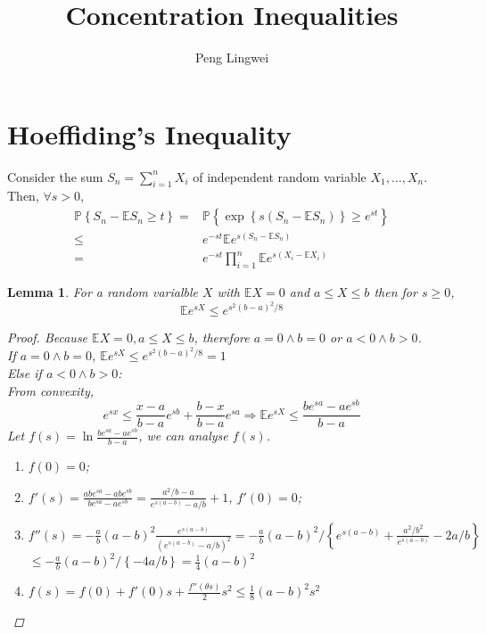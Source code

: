 \documentclass[a4paper]{article}
\title{Concentration Inequalities}
\author{Peng Lingwei}
\newtheorem{lemma}{Lemma}
\begin{document}
\maketitle
\tableofcontents
\newpage

\section{Hoeffiding's Inequality}%
\label{sec:hoeffiding_s_inequality}

Consider the sum $ S_n = \sum^{n}_{i=1} X_i $ of independent random variable $ X_1, \ldots, X_n $.
Then, $ \forall s > 0 $,
\begin{align*}
    \mathbb{P}\left\{ S_n - \mathbb{E}S_n \ge t \right\}
    =& \mathbb{P} \left\{ \exp\left\{ s(S_n - \mathbb{E}S_n) \right\} \ge e^{st} \right\}\\
    \le& e^{-st}\mathbb{E}e^{s(S_n - \mathbb{E}S_n)}\\
    =& e^{-st} \prod^{n}_{i=1} \mathbb{E} e^{s(X_i - \mathbb{E}X_i)}
\end{align*}
\begin{lemma}
    For a random varialble $ X $ with $ \mathbb{E}X = 0 $ and $ a \le X \le b $ then for $ s \ge 0 $,
    \[
        \mathbb{E} e^{sX} \le e^{s^2{(b-a)}^2 / 8}
    \]
    
    \begin{proof}
        Because $ \mathbb{E}X = 0, a \le X \le b $, therefore $ a = 0 \wedge b = 0 $ or $ a < 0 \wedge b > 0 $.\\
        If $ a = 0 \wedge b = 0 $, $ \mathbb{E} e^{sX} \le e^{s^2{(b-a)}^2 / 8} = 1 $\\
        Else if $ a < 0 \wedge b > 0 $:\\
        From convexity,
        \[
            e^{sx} \le \frac{x - a}{b - a} e^{sb} + \frac{b - x}{b-a} e^{sa}
            \Rightarrow
            \mathbb{E}e^{sX} \le \frac{be^{sa} - ae^{sb}}{b-a} 
        \]
        Let $ f(s) = \ln\frac{be^{sa} - ae^{sb}}{b-a} $, we can analyse $ f(s) $.
        \begin{enumerate}
            \item $ f(0) = 0 $;
            \item $ f'(s) = \frac{abe^{sa} - abe^{sb}}{be^{sa} - ae^{sb}} = \frac{a^2/b - a}{e^{s(a-b)} - a/b} + 1 $, $ f'(0) = 0 $;
            \item $ f''(s) = - \frac{a}{b} {(a-b)}^2 \frac{e^{s(a-b)}}{{(e^{s(a-b)} - a/b)}^2} =  -\frac{a}{b} {(a-b)}^2 / \left\{ e^{s(a-b)} + \frac{a^2/b^2}{e^{s(a-b)}} - 2a/b \right\}$
            $ \le -\frac{a}{b} {(a-b)}^2 / \left\{ -4a/b\right\} = \frac{1}{4} {(a-b)}^2$
            \item $ f(s)= f(0) + f'(0)s + \frac{f''(\theta s)}{2} s^2 \le \frac{1}{8} {(a - b)}^2 s^2  $
        \end{enumerate}
    \end{proof}
\end{lemma}
\end{document}
